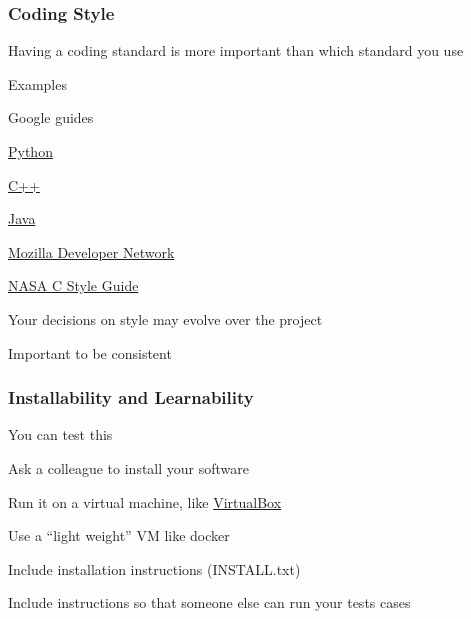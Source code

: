 \documentclass[t,12pt,numbers,fleqn]{beamer}
\begin{document}

\begin{frame}
\frametitle{Coding Style}

\bi
\item Having a coding standard is more important than which standard you use
\item Examples
\bi
\item Google guides
\bi
\item \href{https://google.github.io/styleguide/pyguide.html}{Python}
\item \href{https://google.github.io/styleguide/cppguide.html}{C++}
\item \href{https://google.github.io/styleguide/javaguide.html}{Java}
\ei
\item
  \href{https://developer.mozilla.org/en-US/docs/Mozilla/Developer_guide/Coding_Style}{Mozilla
    Developer Network}
\item \href{http://homepages.inf.ed.ac.uk/dts/pm/Papers/nasa-c-style.pdf}{NASA C
    Style Guide}
\ei
\item Your decisions on style may evolve over the project
\item Important to be consistent
\ei

\end{frame}


\begin{frame}
\frametitle{Installability and Learnability}

\bi
\item You can test this
\item Ask a colleague to install your software
\item Run it on a virtual machine, like
  \href{https://www.virtualbox.org/}{VirtualBox}
\item Use a ``light weight'' VM like docker
\item Include installation instructions (INSTALL.txt)
\item Include instructions so that someone else can run your tests cases
\ei

\end{frame}

\end{document}
